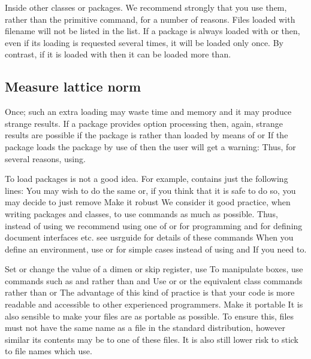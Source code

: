 \documentclass{article}
\begin{document}
Inside other classes or packages. We recommend strongly that you use them, rather than the primitive command, for a number of reasons. Files loaded with filename will not be listed in the list. If a package is always loaded with or then, even if its loading is requested several times, it will be loaded only once. By contrast, if it is loaded with then it can be loaded more than.

\subsection{Measure lattice norm}
Once; such an extra loading may waste time and memory and it may produce strange results. If a package provides option processing then, again, strange results are possible if the package is rather than loaded by means of or If the package loads the package by use of then the user will get a warning: Thus, for several reasons, using.

To load packages is not a good idea. For example, contains just the following lines: You may wish to do the same or, if you think that it is safe to do so, you may decide to just remove Make it robust We consider it good practice, when writing packages and classes, to use commands as much as possible. Thus, instead of using we recommend using one of or for programming and for defining document interfaces etc. see usrguide for details of these commands When you define an environment, use or for simple cases instead of using and If you need to.

Set or change the value of a dimen or skip register, use To manipulate boxes, use commands such as and rather than and Use or or the equivalent class commands rather than or The advantage of this kind of practice is that your code is more readable and accessible to other experienced programmers. Make it portable It is also sensible to make your files are as portable as possible. To ensure this, files must not have the same name as a file in the standard distribution, however similar its contents may be to one of these files. It is also still lower risk to stick to file names which use.
\end{document}
